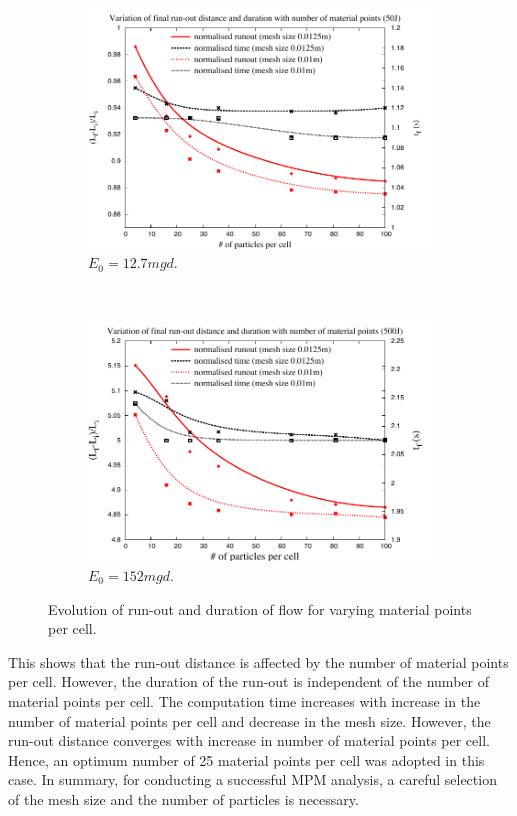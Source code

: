 \begin{figure}[tbhp]
\centering
\begin{subfigure}[b]{0.95\textwidth}
\includegraphics[width=\textwidth]{50}
\caption{$E_0=12.7mgd$.}
\label{fig:50}
\end{subfigure}
\\
\begin{subfigure}[b]{0.95\textwidth}
\centering
\includegraphics[width=\textwidth]{500}
\caption{$E_0=152mgd$.}
\label{fig:500}
\end{subfigure}
\caption{Evolution of run-out and duration of flow  for varying material points 
per cell.}
\label{fig:MPM_Size_Effect}
\end{figure}

This shows that the run-out distance is affected by the number of material 
points per cell. However, the duration of the run-out is independent of the 
number of material points per cell. The computation time increases with 
increase in the number of material points per cell and decrease in the mesh 
size. However, the run-out distance converges with increase in number of 
material points per cell. Hence, an optimum number of 25 material points per 
cell was adopted in this case. In summary, for conducting a successful MPM 
analysis, a careful selection of the mesh size and the number of particles is 
necessary.

